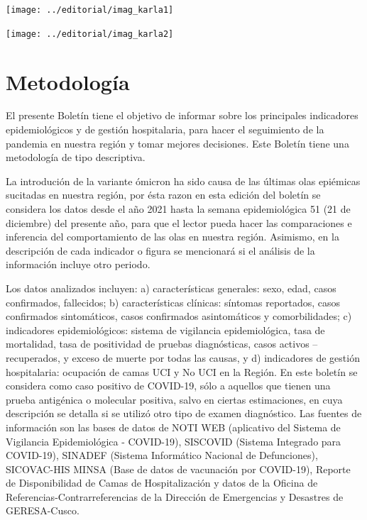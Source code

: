 \documentclass[12pt,a4paper,openany]{book}
\begin{document}
\begin{center}
	\texttt{[image: ../editorial/imag\_karla1]}

\vspace{2mm}
\texttt{[image: ../editorial/imag\_karla2]}
\end{center}

	
		
	
	\clearpage	
	\section*{Metodología}
	
	
	
	\noindent El presente Boletín tiene el objetivo de informar sobre los principales indicadores epidemiológicos y
	de gestión hospitalaria, para hacer el seguimiento de la pandemia en nuestra región y tomar mejores decisiones. Este Boletín tiene una metodología de tipo descriptiva.
	
	La introdución de la variante ómicron ha sido causa de las últimas olas epiémicas sucitadas en nuestra región, por ésta razon en esta edición del boletín se considera los datos desde el año 2021 hasta la semana epidemiológica  51 (21 de diciembre) del presente año, para que el lector pueda hacer las comparaciones e inferencia del comportamiento de las olas en nuestra región. Asimismo, en la descripción de cada indicador o figura se mencionará si el análisis de la información incluye otro periodo.
	
	Los datos analizados incluyen: a) características generales: sexo, edad, casos confirmados,
	fallecidos; b) características clínicas: síntomas reportados, casos confirmados sintomáticos, casos
	confirmados asintomáticos y comorbilidades; c) indicadores epidemiológicos: sistema de vigilancia
	epidemiológica, tasa de mortalidad, tasa de positividad de pruebas diagnósticas, casos activos –
	recuperados, y exceso de muerte por todas las causas, y d) indicadores de gestión hospitalaria: 
	ocupación de camas UCI y No UCI en la Región. En este boletín se considera como caso positivo de
	COVID-19, sólo a aquellos que tienen una prueba antigénica o molecular positiva, salvo en ciertas
	estimaciones, en cuya descripción se detalla si se utilizó otro tipo de examen diagnóstico.
	Las fuentes de información son las bases de datos de NOTI WEB (aplicativo del Sistema de
	Vigilancia Epidemiológica - COVID-19), SISCOVID (Sistema Integrado para COVID-19), SINADEF
	(Sistema Informático Nacional de Defunciones), SICOVAC-HIS MINSA (Base de datos de vacunación
	por COVID-19), Reporte de Disponibilidad de Camas de Hospitalización y datos de la Oficina de
	Referencias-Contrarreferencias de la Dirección de Emergencias y Desastres de GERESA-Cusco.
\end{document}
